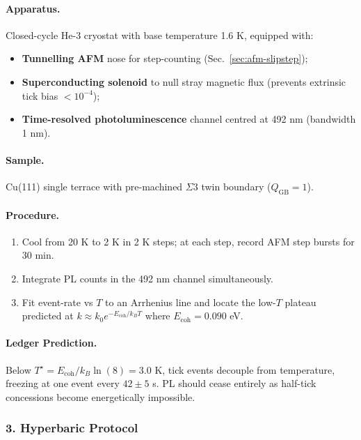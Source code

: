 \documentclass[11pt,oneside]{book}
\begin{document}
{\paragraph{Apparatus.}  
Closed-cycle He-3 cryostat with base temperature 1.6 K, equipped with:

\begin{itemize}
\item \textbf{Tunnelling AFM} nose for step-counting (Sec.~\ref{sec:afm-slipstep});
\item \textbf{Superconducting solenoid} to null stray magnetic flux (prevents extrinsic tick bias $<10^{-4}$);
\item \textbf{Time-resolved photoluminescence} channel centred at 492 nm (bandwidth 1 nm).
\end{itemize}

\paragraph{Sample.}  
Cu(111) single terrace with pre-machined $\Sigma3$ twin boundary ($Q_{\text{GB}}=1$).

\paragraph{Procedure.}
\begin{enumerate}[label=\alph*)]
\item Cool from 20 K to 2 K in 2 K steps; at each step, record AFM step bursts for 30 min.  
\item Integrate PL counts in the 492 nm channel simultaneously.  
\item Fit event-rate vs $T$ to an Arrhenius line and locate the low-$T$ plateau predicted at $k\approx k_0 e^{-E_{\text{coh}}/k_BT}$ where $E_{\text{coh}}=0.090$ eV.
\end{enumerate}

\paragraph{Ledger Prediction.}  
Below $T^\star = E_{\text{coh}}/k_B\ln(8)=3.0$ K, tick events decouple from temperature, freezing at one event every $42\pm5$ s.  PL should cease entirely as half-tick concessions become energetically impossible.

\subsubsection*{3. Hyperbaric Protocol}

}
\end{document}
